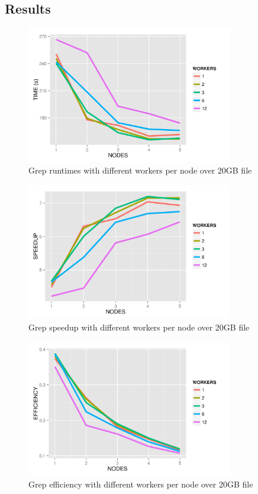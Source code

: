 \documentclass{article}
\begin{document}
\subsection{Results}
    \begin{figure}[ht!]
        \centering
        \includegraphics[width=90mm]{images/workerPerNodeTimes.png}
        \caption{Grep runtimes with different workers per node over 20GB file}
        \label{fig:workNodeTime}
    \end{figure}
    \begin{figure}[ht!]
        \centering
        \includegraphics[width=90mm]{images/workerPerNodeSpeedup.png}
        \caption{Grep speedup with different workers per node over 20GB file}
    \end{figure}
    \begin{figure}[ht!]
        \centering
        \includegraphics[width=90mm]{images/workerPerNodeEfficiency.png}
        \caption{Grep efficiency with different workers per node over 20GB file}
        \label{fig:workNodeEff}
    \end{figure}
\end{document}
